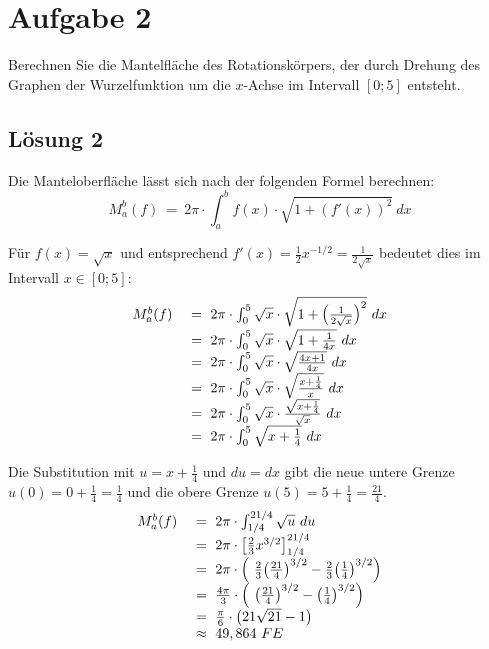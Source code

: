 \documentclass[main.tex]{subfiles}
\begin{document}
\section{Aufgabe 2}
Berechnen Sie die Mantelfläche des Rotationskörpers, der durch Drehung des Graphen der Wurzelfunktion um die $x$-Achse im Intervall $[0;5]$ entsteht.

\subsection{Lösung 2}
Die Manteloberfläche lässt sich nach der folgenden Formel berechnen:
\begin{equation*}
    M_{a}^{b}( f) \ =\ 2\pi \cdotp \int _{a}^{b} f( x) \cdotp \sqrt{1+{( f'( x))}^{2}} \ dx
\end{equation*}

Für $f( x) =\sqrt{x}$ und entsprechend $f'( x) =\frac{1}{2} x^{-1/2} =\frac{1}{2\sqrt{x}}$ bedeutet dies im Intervall $x\in [ 0;5]$:
\begin{equation*}
    \begin{array}{ c l }
        M_{a}^{b}( f) \  & =\ 2\pi \cdotp \int _{0}^{5}\sqrt{x} \cdotp \sqrt{1+{\left(\frac{1}{2\sqrt{x}}\right)}^{2}} \ dx\\
        & =\ 2\pi \cdotp \int _{0}^{5}\sqrt{x} \cdotp \sqrt{1+\frac{1}{4x}} \ dx\\
        & =\ 2\pi \cdotp \int _{0}^{5}\sqrt{x} \cdotp \sqrt{\frac{4x+1}{4x}} \ dx\\
        & =\ 2\pi \cdotp \int\nolimits _{0}^{5}\sqrt{x} \cdotp \sqrt{\frac{x+\frac{1}{4}}{x}} \ dx\\
        & =\ 2\pi \cdotp \int\nolimits _{0}^{5}\sqrt{x} \cdotp \frac{\sqrt{x+\frac{1}{4}}}{\sqrt{x}} \ dx\\
        & =\ 2\pi \cdotp \int\nolimits _{0}^{5}\sqrt{x+\frac{1}{4}} \ dx
    \end{array}
\end{equation*}

Die Substitution mit $u=x+\frac{1}{4}$ und $du=dx$ gibt die neue untere Grenze $u( 0) =0+\frac{1}{4} =\frac{1}{4}$ und die obere Grenze $u( 5) =5+\frac{1}{4} =\frac{21}{4}$. 
\begin{equation*}
    \begin{array}{ c l }
        M_{a}^{b}( f) \  & =\ 2\pi \cdotp \int\nolimits _{1/4}^{21/4}\sqrt{u} \ du\\
        & =\ 2\pi \cdotp \left[\frac{2}{3} x^{3/2}\right]_{1/4}^{21/4}\\
        & =\ 2\pi \cdotp \left( \ \frac{2}{3}{\left(\frac{21}{4}\right)}^{3/2} -\frac{2}{3}{\left(\frac{1}{4}\right)}^{3/2}\right)\\
        & =\ \frac{4\pi }{3} \cdotp \left( \ {\left(\frac{21}{4}\right)}^{3/2} -{\left(\frac{1}{4}\right)}^{3/2}\right)\\
        & =\ \frac{\pi }{6} \cdotp \left( 21\sqrt{21} -1\right)\\
        & \approx \ 49,864\ FE
    \end{array}
\end{equation*}
\end{document}
